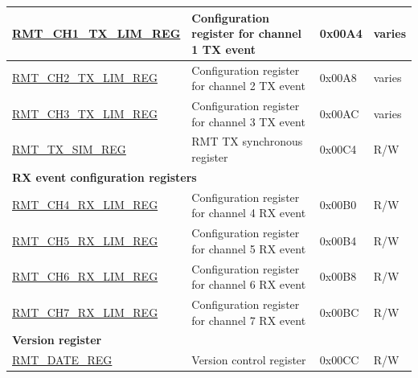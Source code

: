 \begin{longtable}{ | p{5.5cm} | p{6.9cm} | p{1.3cm} | p{1.8cm} | }
\hyperref[regdesc:RMTCHNTXLIMREG]{RMT\_CH1\_TX\_LIM\_REG} & Configuration register for channel 1 TX event & 0x00A4 & varies \\ \hline
\hyperref[regdesc:RMTCHNTXLIMREG]{RMT\_CH2\_TX\_LIM\_REG} & Configuration register for channel 2 TX event & 0x00A8 & varies \\ \hline
\hyperref[regdesc:RMTCHNTXLIMREG]{RMT\_CH3\_TX\_LIM\_REG} & Configuration register for channel 3 TX event & 0x00AC & varies \\ \hline
\hyperref[regdesc:RMTTXSIMREG]{RMT\_TX\_SIM\_REG} & RMT TX synchronous register & 0x00C4 & R/W \\ \hline
\multicolumn{4}{|l|}{\textbf{RX event configuration registers}} \\ \hline
\hyperref[regdesc:RMTCHMRXLIMREG]{RMT\_CH4\_RX\_LIM\_REG} & Configuration register for channel 4 RX event & 0x00B0 & R/W \\ \hline
\hyperref[regdesc:RMTCHMRXLIMREG]{RMT\_CH5\_RX\_LIM\_REG} & Configuration register for channel 5 RX event & 0x00B4 & R/W \\ \hline
\hyperref[regdesc:RMTCHMRXLIMREG]{RMT\_CH6\_RX\_LIM\_REG} & Configuration register for channel 6 RX event & 0x00B8 & R/W \\ \hline
\hyperref[regdesc:RMTCHMRXLIMREG]{RMT\_CH7\_RX\_LIM\_REG} & Configuration register for channel 7 RX event & 0x00BC & R/W \\ \hline
\multicolumn{4}{|l|}{\textbf{Version register}} \\ \hline
\hyperref[regdesc:RMTDATEREG]{RMT\_DATE\_REG} & Version control register & 0x00CC & R/W \\ \hline
\end{longtable}
